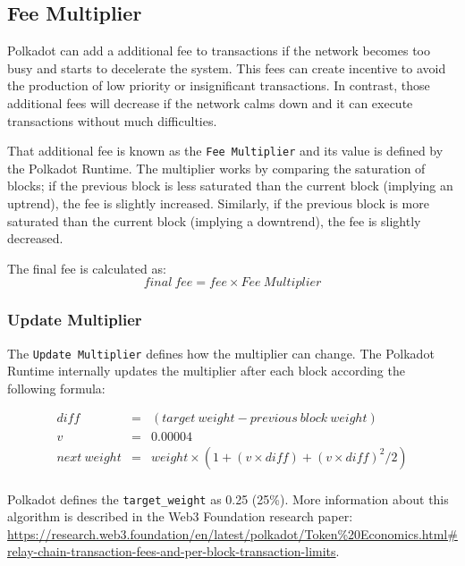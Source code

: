 \documentclass[11pt,a4paper]{article}
\begin{document}
\subsection{Fee Multiplier}
Polkadot can add a additional fee to transactions if the network becomes too
busy and starts to decelerate the system. This fees can create incentive to
avoid the production of low priority or insignificant transactions. In contrast,
those additional fees will decrease if the network calms down and it can execute
transactions without much difficulties.
\newline

That additional fee is known as the \verb|Fee Multiplier| and its value is
defined by the Polkadot Runtime. The multiplier works by comparing the
saturation of blocks; if the previous block is less saturated than the current
block (implying an uptrend), the fee is slightly increased. Similarly, if the
previous block is more saturated than the current block (implying a downtrend),
the fee is slightly decreased.
\newline

The final fee is calculated as:
$$
      final\ fee = fee \times Fee\ Multiplier
$$

\subsubsection{Update Multiplier}
The \verb|Update Multiplier| defines how the multiplier can change. The Polkadot
Runtime internally updates the multiplier after each block according the
following formula:

\begin{eqnarray*}
diff &=& (target\ weight - previous\ block\ weight)\\
v &=& 0.00004\\
next\ weight &=& weight \times (1 + (v \times diff) + (v \times diff)^2 / 2)\\
\end{eqnarray*}

Polkadot defines the \verb|target_weight| as 0.25 (25\%). More information about
this algorithm is described in the Web3 Foundation research paper:
\url{https://research.web3.foundation/en/latest/polkadot/Token%20Economics.html#relay-chain-transaction-fees-and-per-block-transaction-limits}.
\end{document}
